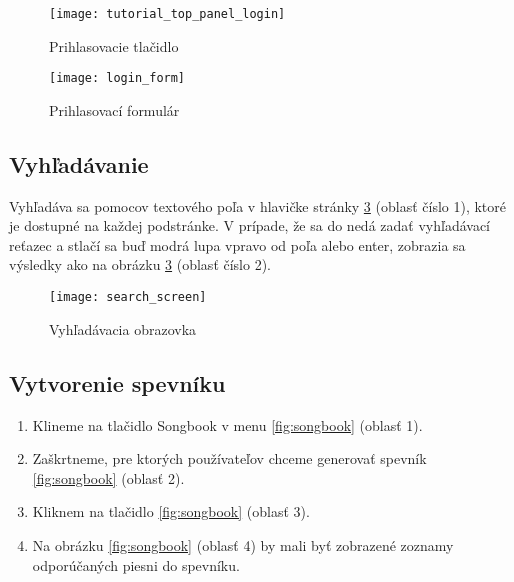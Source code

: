 \begin{figure}
    \begin{center}
        \texttt{[image: tutorial\_top\_panel\_login]}
        \caption{Prihlasovacie tlačidlo}
        \label{fig:login_button}
    \end{center}
\end{figure}

\begin{figure}
    \begin{center}
        \texttt{[image: login\_form]}
        \caption{Prihlasovací formulár}
        \label{fig:login_form}
    \end{center}
\end{figure}

\subsection{Vyhľadávanie}\label{sec:search}

Vyhľadáva sa pomocov textového poľa v hlavičke stránky \ref{fig:search_screen} (oblasť číslo 1),
ktoré je dostupné na každej podstránke. V prípade, že sa do nedá zadať vyhľadávací reťazec a
stlačí sa buď modrá lupa vpravo od poľa alebo enter, zobrazia sa výsledky ako na obrázku
\ref{fig:search_screen} (oblasť číslo 2).

\begin{figure}
    \begin{center}
        \texttt{[image: search\_screen]}
        \caption{Vyhľadávacia obrazovka}
        \label{fig:search_screen}
    \end{center}
\end{figure}

\subsection{Vytvorenie spevníku}

\begin{enumerate}
\item{Klineme na tlačidlo Songbook v menu \ref{fig:songbook} (oblasť 1).}
\item{Zaškrtneme, pre ktorých používateľov chceme generovať spevník \ref{fig:songbook} (oblasť 2).}
\item{Kliknem na tlačidlo  \ref{fig:songbook} (oblasť 3).}
\item{Na obrázku \ref{fig:songbook} (oblasť 4) by mali byť zobrazené zoznamy odporúčaných
    piesni do spevníku.}
\end{enumerate}

